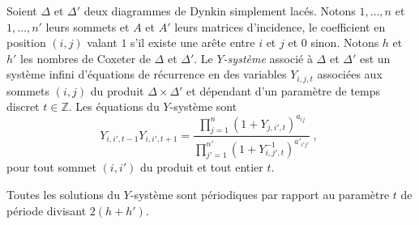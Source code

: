 \documentclass[brochure,12pt]{bourbaki}
\newcommand{\ko}{\: , \;}
\numberwithin{equation}{subsection}
\numberwithin{theorem}{section}
\newcommand{\Z}{\mathbb{Z}}
\begin{document}
Soient $\Delta$ et $\Delta'$ deux
diagrammes de Dynkin simplement lac\'es. Notons $1, \ldots, n$
et $1, \ldots, n'$ leurs sommets et $A$ et $A'$ leurs matrices
d'incidence, le coefficient en position $(i,j)$ valant $1$ s'il
existe une ar\^ete entre $i$ et $j$ et $0$ sinon.
Notons $h$ et $h'$ les nombres de Coxeter de $\Delta$ et $\Delta'$.
Le {\em $Y$-syst\`eme} associ\'e \`a $\Delta$ et $\Delta'$ est un syst\`eme
infini d'\'equations de r\'ecurrence en des variables $Y_{i,j,t}$
associ\'ees aux sommets $(i,j)$ du produit $\Delta \times \Delta'$
et d\'ependant d'un param\`etre de temps discret $t\in\Z$. Les
\'equations du $Y$-syst\`eme sont
\begin{equation} \label{eq:Y-system}
Y_{i,i',t-1} Y_{i,i',t+1} =
\frac{\prod_{j=1}^n (1+Y_{j,i',t})^{a_{ij}}}{\prod_{j'=1}^{n'} (1+Y_{i,j',t}^{-1})^{a'_{i'j'}}} \ko
\end{equation}
pour tout sommet $(i,i')$ du produit et tout entier $t$.

\begin{theo} \label{thm:periodicite} Toutes les solutions du $Y$-syst\`eme sont p\'eriodiques
par rapport au param\`etre $t$ de p\'eriode divisant $2(h+h')$.
\end{theo}
\end{document}
